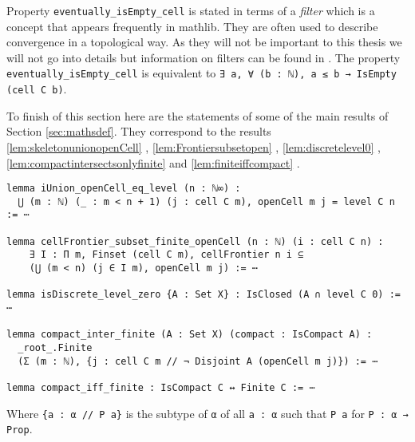Property \lstinline{eventually_isEmpty_cell} is stated in terms of a \emph{filter}
\href{https://github.com/leanprover-community/mathlib4/blob/ed125a4216d18273cb1b96d4c846d32b85d74faf/Mathlib/Order/Filter/Basic.lean#L85-L96}{\faExternalLink}
which is a concept that appears frequently in mathlib.
They are often used to describe convergence in a topological way.
As they will not be important to this thesis we will not go into details but information on filters can be found in \cite{Bourbaki1966}.
The property \lstinline{eventually_isEmpty_cell} is equivalent to \lstinline{∃ a, ∀ (b : ℕ), a ≤ b → IsEmpty (cell C b)}.

To finish of this section here are the statements of some of the main results of Section \ref{sec:mathsdef}.
They correspond to the results \ref{lem:skeletonunionopenCell}
\href{https://github.com/scholzhannah/CWComplexes/blob/7be4872a05b534011cc969eb5b80a4b7f0bf57e2/CWcomplexes/Definition.lean#L320-L322}{\faExternalLink},
 \ref{lem:Frontiersubsetopen}
\href{https://github.com/scholzhannah/CWComplexes/blob/7be4872a05b534011cc969eb5b80a4b7f0bf57e2/CWcomplexes/Definition.lean#L420-L452}{\faExternalLink},
 \ref{lem:discretelevel0}
\href{https://github.com/scholzhannah/CWComplexes/blob/7be4872a05b534011cc969eb5b80a4b7f0bf57e2/CWcomplexes/Lemmas.lean#L108-L109}{\faExternalLink}, 
\ref{lem:compactintersectsonlyfinite} 
\href{https://github.com/scholzhannah/CWComplexes/blob/7be4872a05b534011cc969eb5b80a4b7f0bf57e2/CWcomplexes/Lemmas.lean#L111-L214}{\faExternalLink}
and \ref{lem:finiteiffcompact}
\href{https://github.com/scholzhannah/CWComplexes/blob/7be4872a05b534011cc969eb5b80a4b7f0bf57e2/CWcomplexes/Lemmas.lean#L298-L299}{\faExternalLink}.

\begin{lstlisting}
lemma iUnion_openCell_eq_level (n : ℕ∞) :
  ⋃ (m : ℕ) (_ : m < n + 1) (j : cell C m), openCell m j = level C n := ⋯

lemma cellFrontier_subset_finite_openCell (n : ℕ) (i : cell C n) :
    ∃ I : Π m, Finset (cell C m), cellFrontier n i ⊆
    (⋃ (m < n) (j ∈ I m), openCell m j) := ⋯

lemma isDiscrete_level_zero {A : Set X} : IsClosed (A ∩ level C 0) := ⋯

lemma compact_inter_finite (A : Set X) (compact : IsCompact A) :
  _root_.Finite
  (Σ (m : ℕ), {j : cell C m // ¬ Disjoint A (openCell m j)}) := ⋯

lemma compact_iff_finite : IsCompact C ↔ Finite C := ⋯
\end{lstlisting}

Where \lstinline|{a : α // P a}| is the subtype
\href{https://github.com/leanprover/lean4/blob/0edf1bac392f7e2fe0266b28b51c498306363a84/src/Init/Prelude.lean#L575-L590}{\faExternalLink}
of \lstinline{α} of all \lstinline{a : α} such that \lstinline{P a} for \lstinline{P : α → Prop}.

